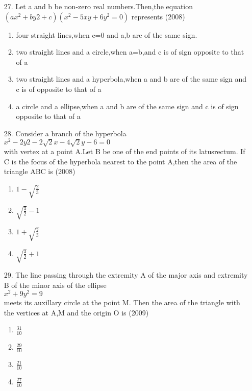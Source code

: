 \documentclass[journal,12pt,twocolumn]{IEEEtran}
\theoremstyle{remark}
\begin{document}
\begin{enumerate}
\item[27.] Let a and b be non-zero real numbers.Then,the equation $(ax^{2}+by{2}+c)(x^{2}-5xy+6y^{2}=0)$ represents \hfill{(2008)}
\begin{enumerate}
    \item four straight lines,when c=0 and a,b are of the same sign.\\
    \item two straight lines and a circle,when a=b,and c is of sign opposite to that of a\\
    \item two straight lines and a hyperbola,when a and b are of the same sign and c is of opposite to that of a\\
    \item a circle and a ellipse,when a and b are of the same sign and c is of sign opposite to that of a\\
\end{enumerate}
\item[28.] Consider a branch of the hyperbola\\$x^{2}-2y{2}-2\sqrt{2}x-4\sqrt{2}y-6=0$\\with vertex at a point A.Let B be one of the end points of its latusrectum. If C is the focus of the hyperbola nearest to the point A,then the area of the triangle ABC is \hfill{(2008)}
\begin{enumerate}
    \item $1-\sqrt{\frac{2}{3}}$\\
    \item $\sqrt{\frac{3}{2}}-1$\\
    \item $1+\sqrt{\frac{2}{3}}$\\
    \item $\sqrt{\frac{3}{2}}+1$\\
\end{enumerate}
\item[29.] The line passing through the extremity A of the major axis and extremity B of the minor axis of the ellipse\\$x^{2}+9y^{2}=9$\\meets its auxillary circle at the point M. Then the area of the triangle with the vertices at A,M and the origin O is \hfill{(2009)}
\begin{enumerate}
    \item $\frac{31}{10}$\\
    \item $\frac{29}{10}$\\
    \item $\frac{21}{10}$\\
    \item $\frac{27}{10}$\\
\end{enumerate}

\end{enumerate}
\end{document}
